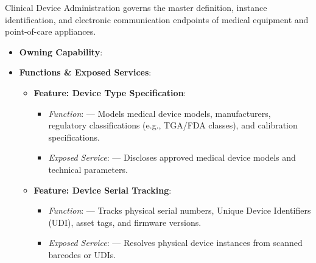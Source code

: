 Clinical Device Administration governs the master definition, instance identification, and electronic communication endpoints of medical equipment and point-of-care appliances.

\label{rad:em:193}

\begin{itemize}

\item
\textbf{Owning Capability}: \texttt{}



\item
\textbf{Functions \& Exposed Services}:


\begin{itemize}

\item
\textbf{Feature: Device Type Specification}:


\begin{itemize}

\item
\emph{Function}: \texttt{} — Models medical device models, manufacturers, regulatory classifications (e.g., TGA/\allowbreak{}FDA classes), and calibration specifications.



\item
\emph{Exposed Service}: \texttt{} — Discloses approved medical device models and technical parameters.



\end{itemize}


\item
\textbf{Feature: Device Serial Tracking}:


\begin{itemize}

\item
\emph{Function}: \texttt{} — Tracks physical serial numbers, Unique Device Identifiers (UDI), asset tags, and firmware versions.



\item
\emph{Exposed Service}: \texttt{} — Resolves physical device instances from scanned barcodes or UDIs.



\end{itemize}



\end{itemize}
\end{itemize}
